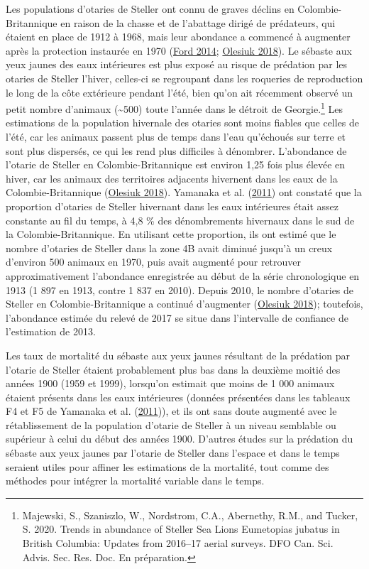 \documentclass[french,11pt]{book}
\begin{document}
Les populations d'otaries de Steller ont connu de graves déclins en Colombie-Britannique en raison de la chasse et de l'abattage dirigé de prédateurs, qui étaient en place de 1912 à 1968, mais leur abondance a commencé à augmenter après la protection instaurée en 1970 (\protect\hyperlink{ref-ford2014}{Ford 2014}; \protect\hyperlink{ref-olesiuk2018}{Olesiuk 2018}). Le sébaste aux yeux jaunes des eaux intérieures est plus exposé au risque de prédation par les otaries de Steller l'hiver, celles-ci se regroupant dans les roqueries de reproduction le long de la côte extérieure pendant l'été, bien qu'on ait récemment observé un petit nombre d'animaux (\textasciitilde500) toute l'année dans le détroit de Georgie.\footnote{Majewski, S., Szaniszlo, W., Nordstrom, C.A., Abernethy, R.M., and Tucker, S. 2020. Trends in abundance of Steller Sea Lions Eumetopias jubatus in British Columbia: Updates from 2016--17 aerial surveys. DFO Can. Sci. Advis. Sec. Res. Doc. En préparation.} Les estimations de la population hivernale des otaries sont moins fiables que celles de l'été, car les animaux passent plus de temps dans l'eau qu'échoués sur terre et sont plus dispersés, ce qui les rend plus difficiles à dénombrer. L'abondance de l'otarie de Steller en Colombie-Britannique est environ 1,25 fois plus élevée en hiver, car les animaux des territoires adjacents hivernent dans les eaux de la Colombie-Britannique (\protect\hyperlink{ref-olesiuk2018}{Olesiuk 2018}). Yamanaka et al. (\protect\hyperlink{ref-yamanaka2011}{2011}) ont constaté que la proportion d'otaries de Steller hivernant dans les eaux intérieures était assez constante au fil du temps, à 4,8 \% des dénombrements hivernaux dans le sud de la Colombie-Britannique. En utilisant cette proportion, ils ont estimé que le nombre d'otaries de Steller dans la zone 4B avait diminué jusqu'à un creux d'environ 500 animaux en 1970, puis avait augmenté pour retrouver approximativement l'abondance enregistrée au début de la série chronologique en 1913 (1 897 en 1913, contre 1 837 en 2010). Depuis 2010, le nombre d'otaries de Steller en Colombie-Britannique a continué d'augmenter (\protect\hyperlink{ref-olesiuk2018}{Olesiuk 2018}); toutefois, l'abondance estimée du relevé de 2017 se situe dans l'intervalle de confiance de l'estimation de 2013.

Les taux de mortalité du sébaste aux yeux jaunes résultant de la prédation par l'otarie de Steller étaient probablement plus bas dans la deuxième moitié des années 1900 (1959 et 1999), lorsqu'on estimait que moins de 1 000 animaux étaient présents dans les eaux intérieures (données présentées dans les tableaux F4 et F5 de Yamanaka et al. (\protect\hyperlink{ref-yamanaka2011}{2011})), et ils ont sans doute augmenté avec le rétablissement de la population d'otarie de Steller à un niveau semblable ou supérieur à celui du début des années 1900. D'autres études sur la prédation du sébaste aux yeux jaunes par l'otarie de Steller dans l'espace et dans le temps seraient utiles pour affiner les estimations de la mortalité, tout comme des méthodes pour intégrer la mortalité variable dans le temps.
\end{document}
